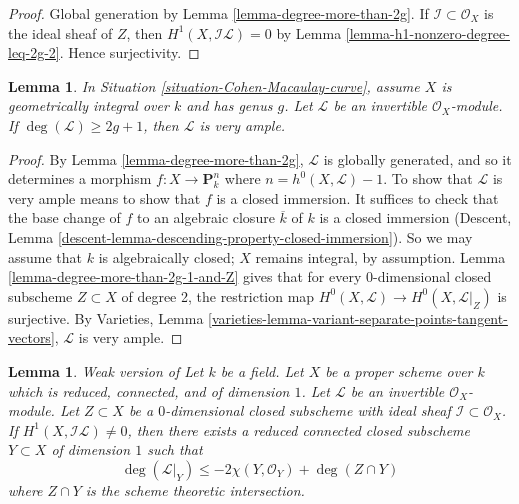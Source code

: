\documentclass{stacks-project}
\newenvironment{reference}{\comment}{\endcomment}
\theoremstyle{plain}
\newtheorem{lemma}[subsection]{Lemma}
\theoremstyle{definition}
\theoremstyle{remark}
\numberwithin{equation}{subsection}
\begin{document}
\begin{proof}
Global generation by Lemma \ref{lemma-degree-more-than-2g}.
If $\mathcal{I} \subset \mathcal{O}_X$ is the ideal sheaf
of $Z$, then $H^1(X, \mathcal{I}\mathcal{L}) = 0$ by
Lemma \ref{lemma-h1-nonzero-degree-leq-2g-2}. Hence surjectivity.
\end{proof}

\begin{lemma}
\label{lemma-degree-at-least-2g+1}
In Situation \ref{situation-Cohen-Macaulay-curve},
assume $X$ is geometrically integral over $k$ and has genus $g$.
Let $\mathcal{L}$ be an invertible $\mathcal{O}_X$-module.
If $\deg(\mathcal{L}) \geq 2g + 1$, then $\mathcal{L}$
is very ample.
\end{lemma}

\begin{proof}
By Lemma \ref{lemma-degree-more-than-2g}, $\mathcal{L}$
is globally generated, and so it determines a morphism
$f : X \to \mathbf{P}^n_k$ where $n = h^0(X,\mathcal{L}) - 1$. To show that
$\mathcal{L}$ is very ample means to show that
$f$ is a closed immersion. It suffices to check that the base change
of $f$ to an algebraic closure $\overline{k}$ of $k$ is a closed immersion
(Descent, Lemma \ref{descent-lemma-descending-property-closed-immersion}).
So we may assume that $k$ is algebraically closed; $X$ remains
integral, by assumption. Lemma \ref{lemma-degree-more-than-2g-1-and-Z}
gives that for every $0$-dimensional closed subscheme
$Z\subset X$ of degree 2,
the restriction map $H^0(X, \mathcal{L}) \to H^0(X, \mathcal{L}|_Z)$
is surjective. By Varieties, Lemma
\ref{varieties-lemma-variant-separate-points-tangent-vectors},
$\mathcal{L}$ is very ample.
\end{proof}


\begin{lemma}
\label{lemma-vanishing-on-gorenstein}
\begin{reference}
Weak version of \cite[Lemma 4]{Jongmin}
\end{reference}
Let $k$ be a field. Let $X$ be a proper scheme over $k$
which is reduced, connected, and of dimension $1$.
Let $\mathcal{L}$ be an invertible $\mathcal{O}_X$-module.
Let $Z \subset X$ be a $0$-dimensional closed subscheme with ideal
sheaf $\mathcal{I} \subset \mathcal{O}_X$.
If $H^1(X, \mathcal{I}\mathcal{L}) \not = 0$, then there exists
a reduced connected closed subscheme $Y \subset X$
of dimension $1$ such that
$$
\deg(\mathcal{L}|_Y) \leq -2\chi(Y, \mathcal{O}_Y) + \deg(Z \cap Y)
$$
where $Z \cap Y$ is the scheme theoretic intersection.
\end{lemma}
\end{document}
